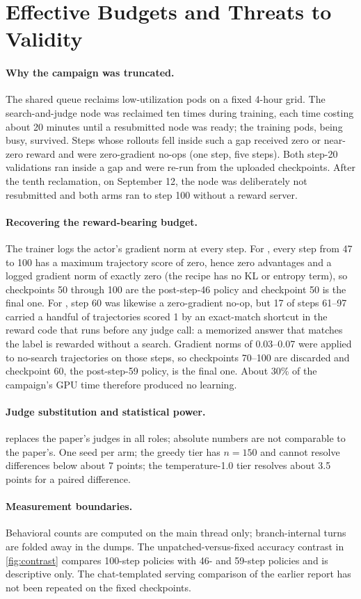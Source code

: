 \section{Effective Budgets and Threats to Validity}
\label{sec:budget}

\paragraph{Why the campaign was truncated.} The shared queue reclaims low-utilization pods on
a fixed 4-hour grid. The search-and-judge node was reclaimed ten times during training, each
time costing about 20 minutes until a resubmitted node was ready; the training pods, being
busy, survived. Steps whose rollouts fell inside such a gap received zero or near-zero reward
and were zero-gradient no-ops (one \foldgrpo{} step, five \grpo{} steps). Both step-20
validations ran inside a gap and were re-run from the uploaded checkpoints. After the tenth
reclamation, on September 12, the node was deliberately not resubmitted and both arms ran to
step 100 without a reward server.

\paragraph{Recovering the reward-bearing budget.} The trainer logs the actor's gradient norm at
every step. For \foldgrpo{}, every step from 47 to 100 has a maximum trajectory score of zero,
hence zero advantages and a logged gradient norm of exactly zero (the recipe has no KL or
entropy term), so checkpoints 50 through 100 are the post-step-46 policy and checkpoint 50 is
the final one. For \grpo{}, step 60 was likewise a zero-gradient no-op, but 17 of steps 61--97
carried a handful of trajectories scored 1 by an exact-match shortcut in the reward code that
runs before any judge call: a memorized answer that matches the label is rewarded without a
search. Gradient norms of 0.03--0.07 were applied to no-search trajectories on those steps, so
checkpoints 70--100 are discarded and checkpoint 60, the post-step-59 policy, is the final one.
About 30\% of the campaign's GPU time therefore produced no learning.

\paragraph{Judge substitution and statistical power.} \judgemodel{} replaces the paper's
judges in all roles; absolute numbers are not comparable to the paper's. One seed per arm;
the greedy tier has $n{=}150$ and cannot resolve differences below about 7 points; the
temperature-1.0 tier resolves about 3.5 points for a paired difference.

\paragraph{Measurement boundaries.} Behavioral counts are computed on the main thread only;
branch-internal turns are folded away in the dumps. The unpatched-versus-fixed accuracy
contrast in \cref{fig:contrast} compares 100-step policies with 46- and 59-step policies and is
descriptive only. The chat-templated serving comparison of the earlier report has not been
repeated on the fixed checkpoints.
